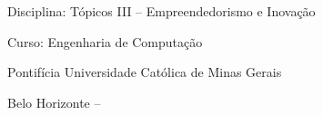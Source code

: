 \begin{folhaderosto}
    \begin{center}
        \vspace*{\fill}

        {\Large\textbf{\projeto}}

        \vspace{1cm}

        {\large Disciplina: Tópicos III -- Empreendedorismo e Inovação}

        \vspace{0.25cm}
        {\large Curso: Engenharia de Computação}

        \vspace{0.25cm}
        {\large Pontifícia Universidade Católica de Minas Gerais}

        \vspace{0.25cm}
        {\large Belo Horizonte -- \anoentrega}

        \vspace*{\fill}
    \end{center}
\end{folhaderosto}